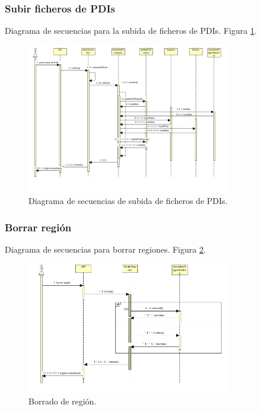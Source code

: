 \subsubsection{Subir ficheros de PDIs}
Diagrama de secuencias para la subida de ficheros de PDIs. Figura \ref{subidapdis}.
\begin{figure}[!htbp]
  \centering
    \includegraphics[width=0.8\textwidth]{../img/diagramas/secuencias/3.jpg}
  \caption{Diagrama de secuencias de subida de ficheros de PDIs.}
  \label{subidapdis}
\end{figure}

\subsubsection{Borrar región}
Diagrama de secuencias para borrar regiones. Figura \ref{borradoregion}.
\begin{figure}[!htbp]
  \centering
    \includegraphics[width=0.8\textwidth]{../img/diagramas/secuencias/5.jpg}
  \caption{Borrado de región.}
  \label{borradoregion}
\end{figure}

